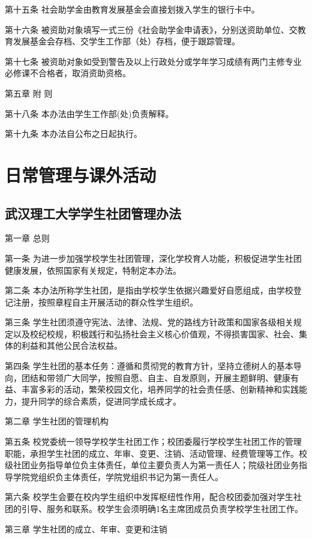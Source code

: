 \documentclass[UTF8,12pt,a4paper]{report}
\begin{document}
第十五条 社会助学金由教育发展基金会直接划拨入学生的银行卡中。

第十六条 被资助对象填写一式三份《社会助学金申请表》，分别送资助单位、交教育发展基金会存档、交学生工作部（处）存档，便于跟踪管理。

第十七条 被资助对象如受到警告及以上行政处分或学年学习成绩有两门主修专业必修课不合格者，取消资助资格。

第五章 附 则

第十八条 本办法由学生工作部(处)负责解释。

第十九条 本办法自公布之日起执行。

\part{日常管理与课外活动}
\chapter{武汉理工大学学生社团管理办法}
第一章  总则

第一条  为进一步加强学校学生社团管理，深化学校育人功能，积极促进学生社团健康发展，依照国家有关规定，特制定本办法。

第二条  本办法所称学生社团，是指由学校学生依据兴趣爱好自愿组成，由学校登记注册，按照章程自主开展活动的群众性学生组织。

第三条  学生社团须遵守宪法、法律、法规、党的路线方针政策和国家各级相关规定以及校纪校规，积极践行和弘扬社会主义核心价值观，不得损害国家、社会、集体的利益和其他公民合法权益。

第四条  学生社团的基本任务：遵循和贯彻党的教育方针，坚持立德树人的基本导向，团结和带领广大同学，按照自愿、自主、自发原则，开展主题鲜明、健康有益、丰富多彩的活动，繁荣校园文化，培养同学的社会责任感、创新精神和实践能力，提升同学的综合素质，促进同学成长成才。



第二章  学生社团的管理机构

第五条  校党委统一领导学校学生社团工作；校团委履行学校学生社团工作的管理职能，承担学生社团的成立、年审、变更、注销、活动管理、经费管理等工作。校级社团业务指导单位负主体责任，单位主要负责人为第一责任人；院级社团业务指导学院党组织负主体责任，学院党组织书记为第一责任人。

第六条  校学生会要在校内学生组织中发挥枢纽性作用，配合校团委加强对学生社团的引导、服务和联系。校学生会须明确1名主席团成员负责学校学生社团工作。



第三章  学生社团的成立、年审、变更和注销
\end{document}
